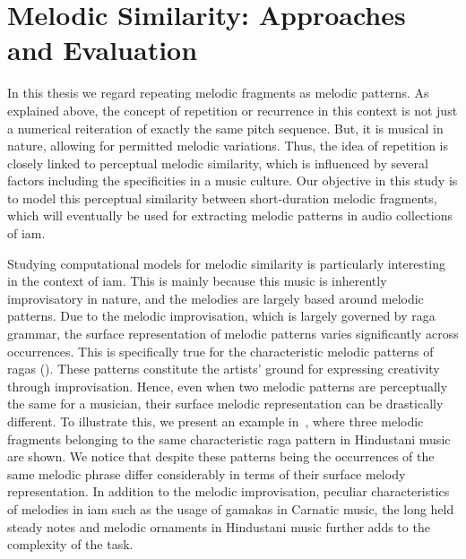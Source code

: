 \section{Melodic Similarity: Approaches and Evaluation}
\label{sec:patterns_evaluation_of_similarity_measures}

In this thesis we regard repeating melodic fragments as melodic patterns. As explained above, the concept of repetition or recurrence in this context is not just a numerical reiteration of exactly the same pitch sequence. But, it is musical in nature, allowing for permitted melodic variations. Thus, the idea of repetition is closely linked to perceptual melodic similarity, which is influenced by several factors including the specificities in a music culture. Our objective in this study is to model this perceptual similarity between short-duration melodic fragments, which will eventually be used for extracting melodic patterns in audio collections of \gls{iam}.

Studying computational models for melodic similarity is particularly interesting in the context of \gls{iam}. This is mainly because this music is inherently improvisatory in nature, and the melodies are largely based around melodic patterns. Due to the melodic improvisation, which is largely governed by \gls{raga} grammar, the surface representation of melodic patterns varies significantly across occurrences. This is specifically true for the characteristic melodic patterns of \glspl{raga} (). These patterns constitute the artists' ground for expressing creativity through improvisation. Hence, even when two melodic patterns are perceptually the same for a musician, their surface melodic representation can be drastically different. To illustrate this, we present an example in~, where three melodic fragments belonging to the same characteristic \gls{raga} pattern in Hindustani music are shown. We notice that despite these patterns being the occurrences of the same melodic phrase differ considerably in terms of their surface melody representation. In addition to the melodic improvisation, peculiar characteristics of melodies in \gls{iam} such as the usage of \glspl{gamaka} in Carnatic music, the long held steady notes and melodic ornaments in Hindustani music further adds to the complexity of the task.

